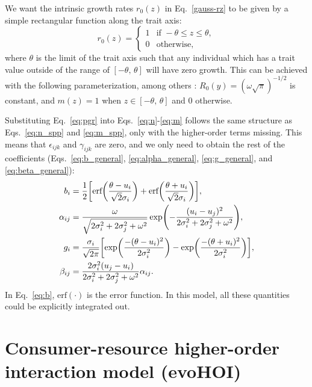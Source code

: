 \documentclass[10pt]{article}
\let\originalleft\left
\let\originalright\right
\renewcommand{\left}{\mathopen{}\mathclose\bgroup\originalleft}
\renewcommand{\right}{\aftergroup\egroup\originalright}
\begin{document}
We want the intrinsic growth rates $r_0(z)$ in Eq.~\ref{gauss-rz} to be given by a simple rectangular function along the trait axis:
\begin{equation}
\label{r_0}
  r_0(z)= 
  \begin{cases}
    1 & \text{if } -\theta \leq z \leq \theta, \\
    0 & \text{otherwise},
    \end{cases}
\end{equation}
where $\theta$ is the limit of the trait axis such that any individual which has a trait value outside of the range of $[-\theta, \, \theta]$ will have zero growth. This can be achieved with the following parameterization, among others \citep{pastore_evolution_2021, barabas_evolution_2022}: $R_0(y) = (\omega \sqrt{\pi})^{-1/2}$ is constant, and $m(z) = 1$ when $z \in [-\theta, \, \theta]$ and 0 otherwise.

Substituting Eq.~\ref{eq:pgr} into Eqs.~\ref{eq:n}-\ref{eq:m} follows the same structure as Eqs.~\ref{eq:n_spp} and \ref{eq:m_spp}, only with the higher-order terms missing. This means that $\epsilon_{ijk}$ and $\gamma_{ijk}$ are zero, and we only need to obtain the rest of the coefficients (Eqs.~\ref{eq:b_general}, \ref{eq:alpha_general}, \ref{eq:g_general}, and \ref{eq:beta_general}):
\begin{align}
  \label{eq:b}
  b_i &= \frac{1}{2} \left[\text{erf} \left( \frac{\theta- u_{i}}{\sqrt{2}\sigma_{i}} \right) + \text{erf} \left( \frac{\theta+ u_{i}}{\sqrt{2}\sigma_{i}} \right) \right] , \\
  \label{eq:alpha}
  \alpha_{ij} &= \frac{\omega}{\sqrt{2\sigma_{i}^2+2\sigma_{j}^2+ \omega^2}} \exp \left(- \frac{(u_{i}- u_{j})^2}{2\sigma_{i}^2+2\sigma_{j}^2+\omega^2} \right) , \\
  \label{eq:g}
  g_i &= \frac{\sigma_{i}}{\sqrt{2\pi}}\left[\exp \left( \frac{ -(\theta - u_{i})^2}{2\sigma_{i}^2}\right) - \exp \left( \frac{ -(\theta + u_{i})^2}{2\sigma_{i}^2}\right)\right] , \\
  \label{eq:beta}
  \beta_{ij} &= \frac{2\sigma_i^2 (u_j - u_i)}{2\sigma_i^2+2\sigma_j^2 + \omega^2} \alpha_{ij} .
\end{align}
In Eq.~\ref{eq:b}, $\text{erf}(\cdot)$ is the error function. In this model, all these quantities could be explicitly integrated out.


\section{Consumer-resource higher-order interaction model (evoHOI)}
\end{document}
